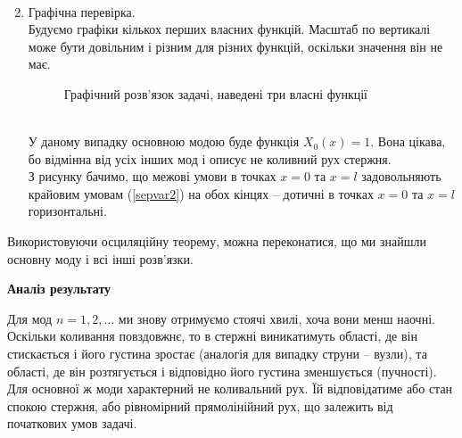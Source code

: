 \begin{enumerate}[wide, labelindent=0pt]
\begin{enumerate}
\begin{equation*}
\begin{aligned}
            \end{aligned}
        \end{equation*}
    \end{enumerate}
    \item Графічна перевірка.\\
    Будуємо графіки кількох перших власних функцій. Масштаб по вертикалі може бути довільним і різним для різних функцій, оскільки значення він не має.
    \begin{figure}[h]
        \centering
        \caption{Графічний розв'язок задачі, наведені три власні функції}        
    \end{figure}\\
    У даному випадку основною модою буде функція $X_0(x) = 1$. Вона цікава, бо відмінна від усіх інших мод і описує не коливний рух стержня.\\
    З рисунку бачимо, що межові умови в точках $x = 0$ та $x = l$ задовольняють крайовим умовам (\ref{sepvar2}) на обох кінцях -- дотичні в точках $x = 0$ та $x = l$ горизонтальні.
\end{enumerate}

Використовуючи осциляційну теорему, можна переконатися, що ми знайшли основну моду і всі інші розв'язки.

\begin{center}
    \large{\textbf{Аналіз результату}}
\end{center}
Для мод $n=1,2,\ldots$ ми знову отримуємо стоячі хвилі, хоча вони менш наочні. Оскільки коливання повздовжнє, то в стержні виникатимуть області, де він стискається і його густина зростає (аналогія для випадку струни -- вузли), та області, де він розтягується і відповідно його густина зменшується (пучності).\\
Для основної ж моди характерний не коливальний рух. Їй відповідатиме або стан спокою стержня, або рівномірний прямолінійний рух, що залежить від початкових умов задачі.